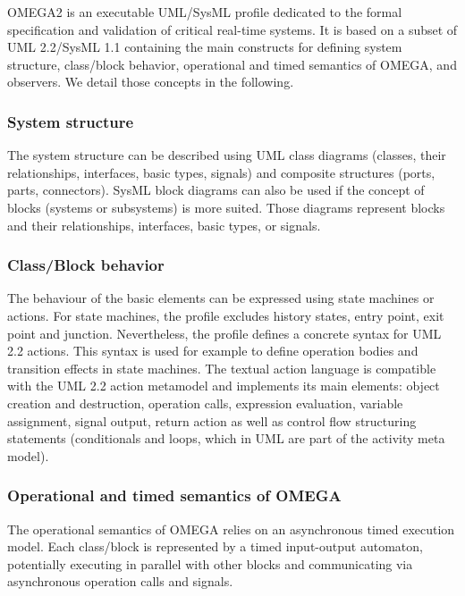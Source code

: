 \documentclass[a4paper,twoside]{article}
\begin{document}
OMEGA2 is an executable UML/SysML profile dedicated to the formal specification and validation of critical real-time systems. It is based on a subset of UML 2.2/SysML 1.1 containing the main constructs for defining system structure,
class/block behavior, operational and timed semantics of OMEGA, and observers.
We detail those concepts in the following.

\subsubsection{System structure}

The system structure can be described using UML class diagrams
(classes, their relationships, interfaces, basic types, signals) and 
composite structures (ports, parts, connectors).
SysML block diagrams can also be used if the concept of blocks (systems or subsystems) is more suited. Those diagrams represent blocks and their relationships, interfaces, basic types, or signals.

\subsubsection{Class/Block behavior}

The behaviour of the basic elements can be expressed using
state machines or actions.
For state machines, the profile excludes history states, entry point, exit point and junction. Nevertheless, the profile defines a concrete syntax for UML 2.2 actions. 
This syntax is used for example to define operation bodies and transition effects in state machines. The textual action language is compatible with the UML 2.2 action metamodel and implements its main elements: object creation and destruction, operation calls, expression evaluation, variable assignment, signal output, return action as well as control flow structuring statements (conditionals and loops, which in UML are part of the activity meta model).

\subsubsection{Operational and timed semantics of OMEGA}

The operational semantics of OMEGA relies on an asynchronous timed execution model. Each class/block is represented by a timed input-output automaton, potentially executing in parallel with other blocks and communicating via asynchronous operation calls and signals. 
\end{document}
